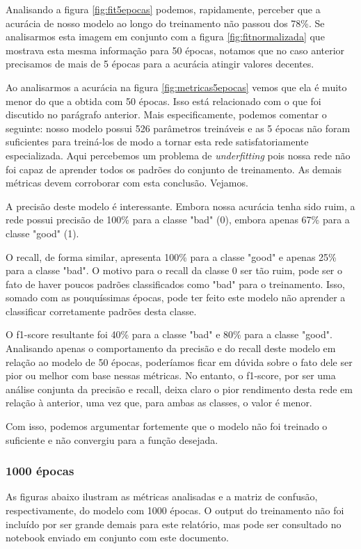 \documentclass[12pt]{article}
\begin{document}
Analisando a figura \ref{fig:fit5epocas} podemos, rapidamente, perceber que a acurácia de nosso modelo ao longo do treinamento não passou dos 78\%. Se analisarmos esta imagem em conjunto com a figura \ref{fig:fitnormalizada} que mostrava esta mesma informação para 50 épocas, notamos que no caso anterior precisamos de mais de 5 épocas para a acurácia atingir valores decentes. 

Ao analisarmos a acurácia na figura \ref{fig:metricas5epocas} vemos que ela é muito menor do que a obtida com 50 épocas. Isso está relacionado com o que foi discutido no parágrafo anterior. Mais especificamente, podemos comentar o seguinte: nosso modelo possui 526 parâmetros treináveis e as 5 épocas não foram suficientes para treiná-los de modo a tornar esta rede satisfatoriamente especializada. Aqui percebemos um problema de \textit{underfitting} pois nossa rede não foi capaz de aprender todos os padrões do conjunto de treinamento. As demais métricas devem corroborar com esta conclusão. Vejamos.

A precisão deste modelo é interessante. Embora nossa acurácia tenha sido ruim, a rede possui precisão de 100\% para a classe "bad" (0), embora apenas 67\% para a classe "good" (1).

O recall, de forma similar, apresenta 100\% para a classe "good" e apenas 25\% para a classe "bad". O motivo para o recall da classe 0 ser tão ruim, pode ser o fato de haver poucos padrões classificados como "bad" para o treinamento. Isso, somado com as pouquíssimas épocas, pode ter feito este modelo não aprender a classificar corretamente padrões desta classe.

O f1-score resultante foi 40\% para a classe "bad" e 80\% para a classe "good". Analisando apenas o comportamento da precisão e do recall deste modelo em relação ao modelo de 50 épocas, poderíamos ficar em dúvida sobre o fato dele ser pior ou melhor com base nessas métricas. No entanto, o f1-score, por ser uma análise conjunta da precisão e recall, deixa claro o pior rendimento desta rede em relação à anterior, uma vez que, para ambas as classes, o valor é menor.

Com isso, podemos argumentar fortemente que o modelo não foi treinado o suficiente e não convergiu para a função desejada.


\subsubsection{1000 épocas}

As figuras abaixo ilustram as métricas analisadas e a matriz de confusão, respectivamente, do modelo com 1000 épocas. O output do treinamento não foi incluído por ser grande demais para este relatório, mas pode ser consultado no notebook enviado em conjunto com este documento.
\end{document}
